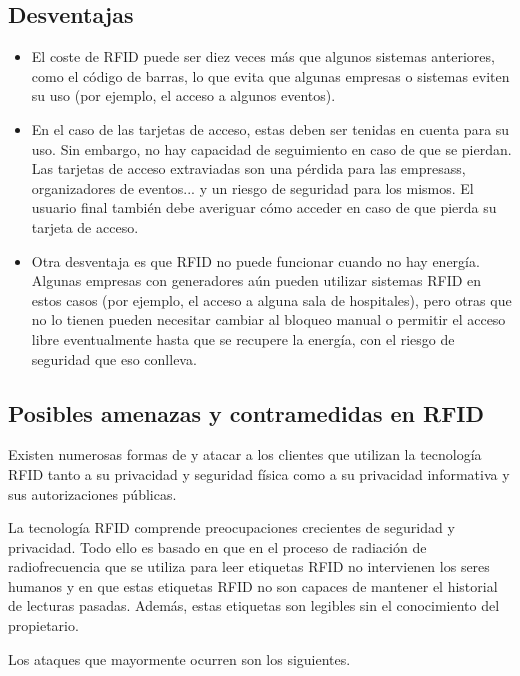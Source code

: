 \documentclass[12pt,a4paper,onecolumn,oneside]{report}
\begin{document}
\subsection{Desventajas}
\begin{itemize}
\item El coste de RFID puede ser diez veces más que algunos sistemas anteriores, como el código de barras, lo que evita que algunas empresas o sistemas eviten su uso (por ejemplo, el acceso a algunos eventos). 
\item En el caso de las tarjetas de acceso, estas deben ser tenidas en cuenta para su uso. Sin embargo, no hay capacidad de seguimiento en caso de que se pierdan. Las tarjetas de acceso extraviadas son una pérdida para las empresass, organizadores de eventos... y un riesgo de seguridad para los mismos. El usuario final también debe averiguar cómo acceder en caso de que pierda su tarjeta de acceso.
\item Otra desventaja es que RFID no puede funcionar cuando no hay energía. Algunas empresas con generadores aún pueden utilizar sistemas RFID en estos casos (por ejemplo, el acceso a alguna sala de hospitales), pero otras que no lo tienen pueden necesitar cambiar al bloqueo manual o permitir el acceso libre eventualmente hasta que se recupere la energía, con el riesgo de seguridad que eso conlleva.
\end{itemize}


\subsection{Posibles amenazas y contramedidas en RFID}

Existen numerosas formas de y atacar a los clientes que utilizan la tecnología RFID tanto a su privacidad y seguridad física como a su privacidad informativa y sus autorizaciones públicas.

La tecnología RFID comprende preocupaciones crecientes de seguridad y privacidad. Todo ello es basado en que en el proceso de radiación de radiofrecuencia que se utiliza para leer etiquetas RFID no intervienen los seres humanos y en que estas etiquetas RFID no son capaces de mantener el historial de lecturas pasadas. Además, estas etiquetas son legibles sin el conocimiento del propietario.

Los ataques que mayormente ocurren son los siguientes.
\end{document}
